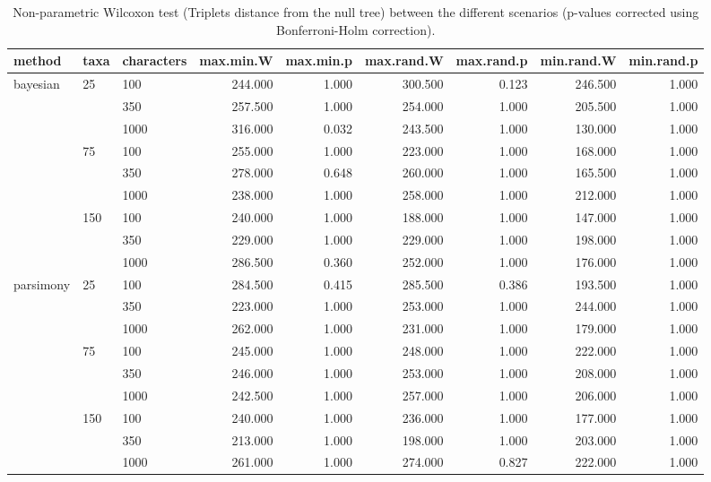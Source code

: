 \begin{table}[ht]
\centering
\begin{tabular}{lllrrrrrr}
  \hline
method & taxa & characters & max.min.W & max.min.p & max.rand.W & max.rand.p & min.rand.W & min.rand.p \\ 
  \hline
bayesian & 25 & 100 & 244.000 & 1.000 & 300.500 & 0.123 & 246.500 & 1.000 \\ 
   &  & 350 & 257.500 & 1.000 & 254.000 & 1.000 & 205.500 & 1.000 \\ 
   &  & 1000 & 316.000 & 0.032 & 243.500 & 1.000 & 130.000 & 1.000 \\ 
   & 75 & 100 & 255.000 & 1.000 & 223.000 & 1.000 & 168.000 & 1.000 \\ 
   &  & 350 & 278.000 & 0.648 & 260.000 & 1.000 & 165.500 & 1.000 \\ 
   &  & 1000 & 238.000 & 1.000 & 258.000 & 1.000 & 212.000 & 1.000 \\ 
   & 150 & 100 & 240.000 & 1.000 & 188.000 & 1.000 & 147.000 & 1.000 \\ 
   &  & 350 & 229.000 & 1.000 & 229.000 & 1.000 & 198.000 & 1.000 \\ 
   &  & 1000 & 286.500 & 0.360 & 252.000 & 1.000 & 176.000 & 1.000 \\ 
  parsimony & 25 & 100 & 284.500 & 0.415 & 285.500 & 0.386 & 193.500 & 1.000 \\ 
   &  & 350 & 223.000 & 1.000 & 253.000 & 1.000 & 244.000 & 1.000 \\ 
   &  & 1000 & 262.000 & 1.000 & 231.000 & 1.000 & 179.000 & 1.000 \\ 
   & 75 & 100 & 245.000 & 1.000 & 248.000 & 1.000 & 222.000 & 1.000 \\ 
   &  & 350 & 246.000 & 1.000 & 253.000 & 1.000 & 208.000 & 1.000 \\ 
   &  & 1000 & 242.500 & 1.000 & 257.000 & 1.000 & 206.000 & 1.000 \\ 
   & 150 & 100 & 240.000 & 1.000 & 236.000 & 1.000 & 177.000 & 1.000 \\ 
   &  & 350 & 213.000 & 1.000 & 198.000 & 1.000 & 203.000 & 1.000 \\ 
   &  & 1000 & 261.000 & 1.000 & 274.000 & 0.827 & 222.000 & 1.000 \\ 
   \hline
\end{tabular}
\caption{Non-parametric Wilcoxon test (Triplets distance from the null tree) between the different scenarios (p-values corrected using Bonferroni-Holm correction).} 
\label{Full_Tab_BCTrnull}
\end{table}
